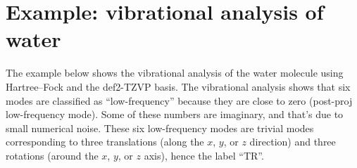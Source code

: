 \documentclass[../Main/chem371-notes.tex]{subfiles}
\begin{document}
\section{Example: vibrational analysis of water}


The example below shows the vibrational analysis of the water molecule using Hartree--Fock and the def2-TZVP basis.
The vibrational analysis shows that six modes are classified as ``low-frequency'' because they are close to zero (post-proj low-frequency mode).
Some of these numbers are imaginary, and that's due to small numerical noise.
These six low-frequency modes are trivial modes corresponding to three translations (along the $x$, $y$, or $z$ direction) and three rotations (around the $x$, $y$, or $z$ axis), hence the label ``TR''.
\end{document}

